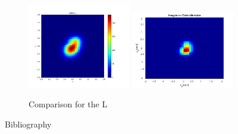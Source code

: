 \documentclass[xcolor=dvipsnames]{beamer}
\begin{document}
\begin{frame}
\begin{figure}
 \centering

{  \includegraphics[width=0.4\textwidth]{pictures/Ghost_L.png} }
{  \includegraphics[width=0.4\textwidth]{pictures/Imagen_41x41.png} }
\caption{Comparison for the L}
 \label{n1}
\end{figure}

\end{frame}




\begin{frame}{Bibliography}


\end{frame}









    
  
\end{document}
